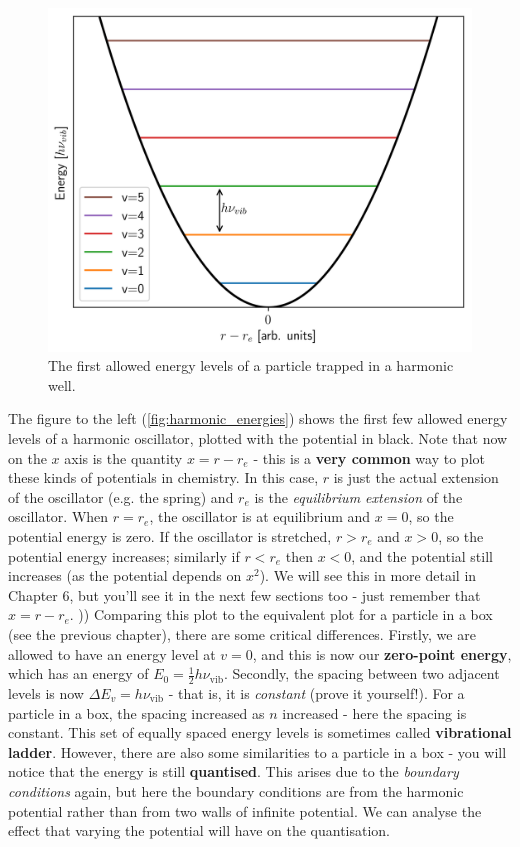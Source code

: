 \documentclass{memoir}[11pt,oneside,a4paper,openany]
\newcommand{\nuv}{\ensuremath{\nu_{\text{vib}}}}
\begin{document}
\begin{figure}
	\centering
	\includegraphics[width=\linewidth]{harmonic_oscillator_energies}
	 \caption{The first allowed energy levels of a particle trapped in a harmonic well.}\label{fig:harmonic_energies}
\end{figure}
The figure to the left (\autoref{fig:harmonic_energies}) shows the first few allowed energy levels of a harmonic oscillator, plotted with the potential in black. Note that now on the $x$ axis is the quantity $x = r-r_e$ - this is a \textbf{very common} way to plot these kinds of potentials in chemistry. In this case, $r$ is just the actual extension of the oscillator (e.g. the spring) and $r_e$ is the \emph{equilibrium extension} of the oscillator. When $r = r_e$, the oscillator is at equilibrium and $x=0$, so the potential energy is zero. If the oscillator is stretched, $r > r_e$ and $x > 0$, so the potential energy increases; similarly if $r < r_e$ then $x < 0$, and the potential still increases (as the potential depends on $x^2$). We will see this in more detail in Chapter 6, but you'll see it in the next few sections too - just remember that $x = r - r_e$.
))
Comparing this plot to the equivalent plot for a particle in a box (see the previous chapter), there are some critical differences. Firstly, we are allowed to have an energy level at $v=0$, and this is now our \textbf{zero-point energy}, which has an energy of $E_0 = \frac{1}{2}h\nuv$. Secondly, the spacing between two adjacent levels is now $\Delta E_v = h\nuv$ - that is, it is \emph{constant} (prove it yourself!). For a particle in a box, the spacing increased as $n$ increased - here the spacing is constant. This set of equally spaced energy levels is sometimes called \textbf{vibrational ladder}. However, there are also some similarities to a particle in a box - you will notice that the energy is still \textbf{quantised}. This arises due to the \emph{boundary conditions} again, but here the boundary conditions are from the harmonic potential rather than from two walls of infinite potential. We can analyse the effect that varying the potential will have on the quantisation.
\end{document}
